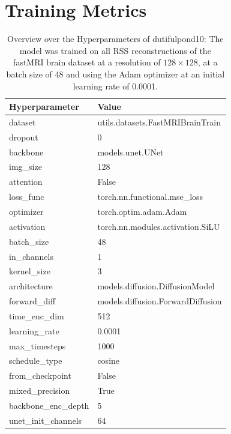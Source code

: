 \chapter{Training Metrics}
\begin{table}
    \centering
    \caption[Hyperparameter Overview dutifulpond10]{Overview over the Hyperparameters of dutifulpond10: The model was trained on all RSS reconstructions of the fastMRI brain dataset at a resolution of $128\times 128$, at a batch size of 48 and using the Adam optimizer at an initial learning rate of 0.0001.}
    \begin{tabular}{l l}
        Hyperparameter       & Value                             \\
        \hline
        dataset              & utils.datasets.FastMRIBrainTrain  \\
        dropout              & 0                                 \\
        backbone             & models.unet.UNet                  \\
        img\_size            & 128                               \\
        attention            & False                             \\
        loss\_func           & torch.nn.functional.mse\_loss     \\
        optimizer            & torch.optim.adam.Adam             \\
        activation           & torch.nn.modules.activation.SiLU  \\
        batch\_size          & 48                                \\
        in\_channels         & 1                                 \\
        kernel\_size         & 3                                 \\
        architecture         & models.diffusion.DiffusionModel   \\
        forward\_diff        & models.diffusion.ForwardDiffusion \\
        time\_enc\_dim       & 512                               \\
        learning\_rate       & 0.0001                            \\
        max\_timesteps       & 1000                              \\
        schedule\_type       & cosine                            \\
        from\_checkpoint     & False                             \\
        mixed\_precision     & True                              \\
        backbone\_enc\_depth & 5                                 \\
        unet\_init\_channels & 64                                \\
    \end{tabular}
\end{table}

